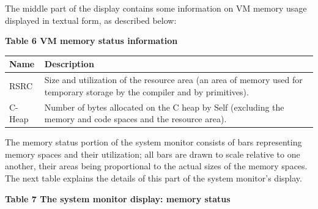 \documentclass[letterpaper,10pt,english]{sphinxmanual}
\begin{document}
The middle part of the display contains some information on VM memory usage displayed in textual
form, as described below:

\textbf{Table 6 VM memory status information}

\begin{tabulary}{\linewidth}{p{5cm} p{10cm}}
\hline
\textbf{
Name
} & \textbf{
Description
}\\\hline

RSRC
 & 
Size and utilization of the resource area (an area of memory used for temporary storage by the
compiler and by primitives).
\\\hline

C-Heap
 & 
Number of bytes allocated on the C heap by Self (excluding the memory and code spaces and the
resource area).
\\\hline
\end{tabulary}


The memory status portion of the system monitor consists of bars representing memory spaces and
their utilization; all bars are drawn to scale relative to one another, their areas being proportional
to the actual sizes of the memory spaces. The next table explains the details of this part of the system
monitor’s display.

\textbf{Table 7 The system monitor display: memory status}
\end{document}
